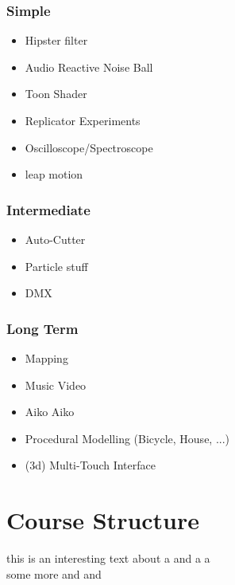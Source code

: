 \subsubsection{Simple}
\begin{itemize}
	\item Hipster filter
	\item Audio Reactive Noise Ball
	\item Toon Shader
	\item Replicator Experiments
	\item Oscilloscope/Spectroscope
	\item leap motion
\end{itemize}

\subsubsection{Intermediate}
\begin{itemize}
	\item \glqq{}Auto-Cutter\grqq{}
	\item Particle stuff
	\item DMX
\end{itemize}

\subsubsection{Long Term}
\begin{itemize}
	\item Mapping
	\item Music Video
	\item Aiko Aiko
	\item Procedural Modelling (Bicycle, House, ...)
	\item (3d) Multi-Touch Interface

\end{itemize}

\section{Course Structure} %


this is an interesting text about a \TOP and a \CHOP a \SOP
\\
some more \COMPs and \DATs and \MATs

